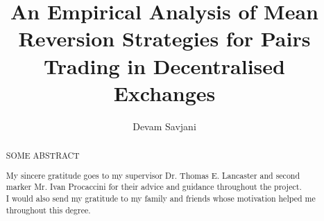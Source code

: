 \documentclass[a4paper, 11pt]{report}
\title{An Empirical Analysis of Mean Reversion Strategies for Pairs Trading in Decentralised Exchanges}
\author{Devam Savjani}
\begin{document}


\begin{abstract}
    SOME ABSTRACT
\end{abstract}

\renewcommand{\abstractname}{Acknowledgements}
\begin{abstract}
My sincere gratitude goes to my supervisor Dr. Thomas E. Lancaster and second marker Mr. Ivan Procaccini for their advice and guidance throughout the project.
\\[5mm]
I would also send my gratitude to my family and friends whose motivation helped me throughout this degree.
\end{abstract}

\tableofcontents












\end{document}
